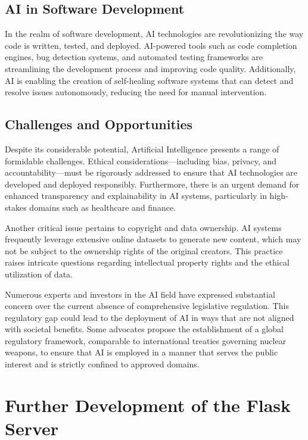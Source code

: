 \subsection{AI in Software Development}

In the realm of software development, AI technologies are revolutionizing the way code is written, tested, and deployed. 
AI-powered tools such as code completion engines, bug detection systems, and automated testing frameworks are streamlining the development process and improving code quality. 
Additionally, AI is enabling the creation of self-healing software systems that can detect and resolve issues autonomously, reducing the need for manual intervention.

\subsection{Challenges and Opportunities}
\label{ref:challanges-and-opportunities}

Despite its considerable potential, Artificial Intelligence presents a range of formidable challenges. Ethical considerations—including bias, privacy, and accountability—must be rigorously addressed to ensure that AI technologies are developed and deployed responsibly. Furthermore, there is an urgent demand for enhanced transparency and explainability in AI systems, particularly in high-stakes domains such as healthcare and finance.

Another critical issue pertains to copyright and data ownership. AI systems frequently leverage extensive online datasets to generate new content, which may not be subject to the ownership rights of the original creators. This practice raises intricate questions regarding intellectual property rights and the ethical utilization of data.

Numerous experts and investors in the AI field have expressed substantial concern over the current absence of comprehensive legislative 
regulation. This regulatory gap could lead to the deployment of AI in ways that are not aligned with societal benefits. 
Some advocates propose the establishment of a global regulatory framework, comparable to international treaties governing 
nuclear weapons, to ensure that AI is employed in a manner that serves the public interest and is strictly confined to approved domains.

\cite{ext-risk-ai}


\section{Further Development of the Flask Server}

